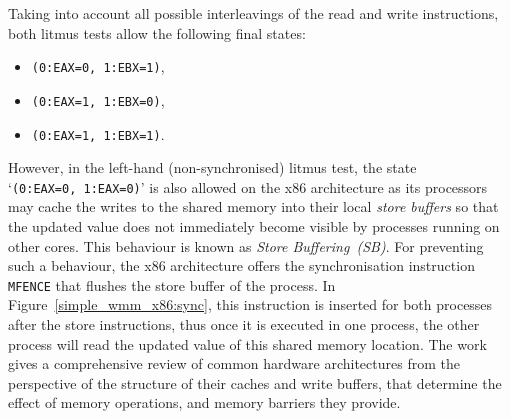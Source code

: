 Taking into account all possible interleavings of the read and write instructions, both litmus tests allow the following final states:
\begin{itemize}[noitemsep,topsep=0pt]
\item \texttt{(0:EAX=0,~1:EBX=1)},
\item \texttt{(0:EAX=1,~1:EBX=0)},
\item \texttt{(0:EAX=1,~1:EBX=1)}.
\end{itemize}
However, in the left-hand (non-synchronised) litmus test, the state `\texttt{(0:EAX=0,~1:EAX=0)}' is also allowed on the x86 architecture as its processors may cache the writes to the shared memory into their local \textit{store buffers} so that the updated value does not immediately become visible by processes running on other cores.
This behaviour is known as \textit{Store Buffering~(SB)}.
For preventing such a behaviour, the x86 architecture offers the synchronisation instruction \texttt{MFENCE} that flushes the store buffer of the process.
In Figure~\ref{simple_wmm_x86:sync}, this instruction is inserted for both processes after the store instructions, thus once it is executed in one process, the other process will read the updated value of this shared memory location.
The work~\cite{mckenney2010memory} gives a comprehensive review of common hardware architectures from the perspective of the structure of their caches and write buffers, that determine the effect of memory operations, and memory barriers they provide.


